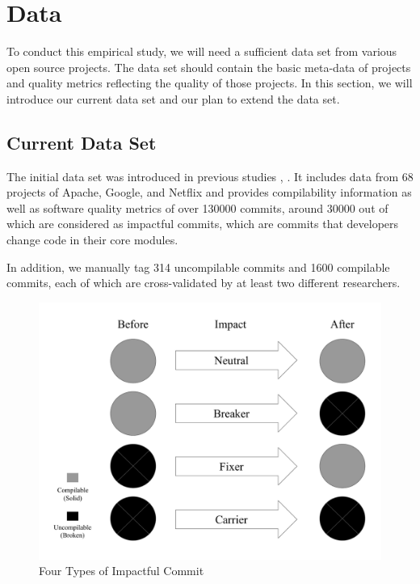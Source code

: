 \section{Data}

To conduct this empirical study, we will need a sufficient data set from various open source projects.
The data set should contain the basic meta-data of projects and quality metrics reflecting the quality of those projects.
In this section, we will introduce our current data set and our plan to extend the data set.

\subsection{Current Data Set}
\label{sec:data}

The initial data set was introduced in previous studies \cite{pooyan_esem}, \cite{pooyan_qrs}. 
It includes data from 68 projects of Apache, Google, and Netflix and provides compilability information as well as software quality metrics of over 130000 commits, around 30000 out of which are considered as impactful commits, which are commits that developers change code in their core modules.

In addition, we manually tag 314 uncompilable commits and 1600 compilable commits, each of which are cross-validated by at least two different researchers.

\begin{figure}[htbp]
    \centerline{\includegraphics[scale=0.3]{figures/terminology.pdf}}
    \caption{Four Types of Impactful Commit}
    \label{fig:terminology}
    \end{figure}

